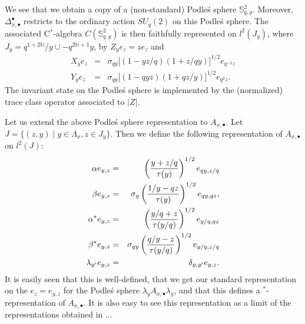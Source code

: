 We see that we obtain a copy of a (non-standard) Podle\'{s} sphere $\mathbb{S}_{q,y}^2$. Moreover, $\Delta_{x,\bullet}^{\bullet}$ restricts to the ordinary action $SU_q(2)$ on this Podle\'{s} sphere. The associated C$^*$-algebra $C(\mathbb{S}_{q,y}^2)$ is then faithfully represented on $l^2(J_{y})$, where $J_y = q^{1+2\mathbb{N}}/y\cup -q^{2\mathbb{N}+1}y$, by $Z_ye_z = z e_{z}$ and \begin{eqnarray*} X_ye_{z} &=& \sigma_{qy} \lbrack (1-yz/q)(1+z/qy)\rbrack^{1/2}e_{q^{-2}z}\\ Y_ye_{z} &=& \sigma_{qy} \lbrack (1-qyz)(1+qz/y)\rbrack^{1/2}e_{q^2z}.\end{eqnarray*} The invariant state on the Podle\'{s} sphere is implemented by the (normalized) trace class operator associated to $|Z|$. 

Let us extend the above Podle\'{s} sphere representation to $A_{x,\bullet}$.  Let $J =\{(z,y)\mid y \in \Lambda_x, z \in J_{y}\}$. Then we define the following representation of $A_{x,\bullet}$ on $l^2(J)$: \begin{eqnarray*} \alpha e_{y,z} &=&  \left(\frac{y+z/q}{\operatorname{\tau}(y)}\right)^{1/2}e_{qy,z/q}\\ \beta e_{y,z} &=&  \sigma_y \left( \frac{1/y-qz}{\operatorname{\tau}(y)}\right)^{1/2}e_{qy,qz},  \\  \alpha^* e_{y,z} &=&  \left(\frac{y/q+z}{\operatorname{\tau}(y/q)}\right)^{1/2}e_{y/q,qz} \\ \beta^* e_{y,z} &=& \sigma_{qy}\left( \frac{q/y-z}{\operatorname{\tau}(y/q)}\right)^{1/2}e_{y/q,z/q}
 \\ \lambda_{y'} e_{y,z} &=& \delta_{y,y'}e_{y,z}. \end{eqnarray*} It is easily seen that this is well-defined, that we get our standard representation on the $e_{z} = e_{y,z}$ for the Podle\'{s} sphere $\lambda_y A_{x,\bullet}\lambda_y$, and that this defines a $^*$-representation of $A_{x,\bullet}$. It is also easy to see this representation as a limit of the representations obtained in ...


